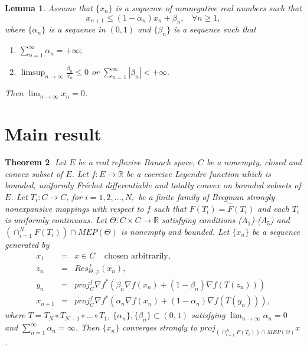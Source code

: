 \documentclass[reqno,b5paper]{amsart}
\theoremstyle{plain}
\newtheorem{theorem}{Theorem}[section]
\newtheorem{lemma}[theorem]{Lemma}
\theoremstyle{definition}
\numberwithin{equation}{section}
\numberwithin{equation}{section}
\begin{document}
\begin{lemma}\cite{xu}\label{444}
Assume that $\{x_{n}\}$ is a sequence of nonnegative real numbers such that 
$$x_{n+1}\leq (1-\alpha_{n})x_{n}+\beta_{n}, \ \ \ \ \forall n\geq1,$$
where $\{\alpha_{n}\}$ is a sequence in $(0,1)$ and $\{\beta_{n}\}$ is a sequence such that
\begin{enumerate}
\item
$\sum_{n=1}^{\infty}\alpha_{n}=+\infty;$

\item
$\limsup_{n\to\infty}\frac{\beta_{n}}{x_{n}}\leq 0$ or $\sum_{n=1}^{\infty}|\beta_{n}|<+\infty.$
\end{enumerate}
Then $\lim_{n\to\infty}x_{n}=0$.
\end{lemma}
\section{Main result}
\begin{theorem}\label{mt}
Let $E$ be a real reflexive Banach space, $C$ be a nonempty, closed and convex subset of $E$. Let $f:E\to \mathbb{R}$ be a coercive Legendre function which is bounded, uniformly Fr\'{e}chet differentiable and totally convex on bounded subsets of $E$. Let $T_{i}:C\to C$, for $i=1,2,\ldots, N,$ be a finite family of Bregman strongly nonexpansive mappings with respect to $f$ such that $F(T_{i})=\widehat{F}(T_{i})$ and each $T_{i}$ is uniformly continuous. Let $\Theta:C\times C\to\mathbb{R}$ satisfying conditions ($A_{1}$)-($A_{5}$) and $\left(\cap_{i=1}^{N}F(T_{i})\right)\cap MEP(\Theta)$ is nonempty and bounded. Let $\{x_{n}\}$ be a sequence generated by 
\begin{eqnarray}
x_{1}&=&x\in C \ \ \ \ \  \text{chosen arbitrarily},\nonumber\\
z_{n}&=&Res_{\Theta,\varphi}^{f}(x_{n}),\nonumber\\
y_{n}&=&proj_{C}^{f}\nabla f^{*}(\beta_{n}\nabla f(x_{n})+(1-\beta_{n})\nabla f(T(z_{n})))\nonumber\\
x_{n+1}&=&proj_{C}^{f}\nabla f^{*}(\alpha_{n}\nabla f(x_{n})+(1-\alpha_{n})\nabla f (T(y_{n}))),\label{main}
\end{eqnarray}
where $T=T_{N}\circ T_{N-1}\circ\ldots\circ T_{1}$, $\{\alpha_{n}\}, \{\beta_{n}\}\subset (0,1)$ satisfying $\lim_{n\to\infty}\alpha_{n}=0$ and $\sum_{n=1}^{\infty}\alpha_{n}=\infty$. Then $\{x_{n}\}$ converges strongly to $proj_{(\cap_{i=1}^{N}F(T_{i}))\cap MEP(\Theta)}x$.
\end{theorem}
\end{document}
